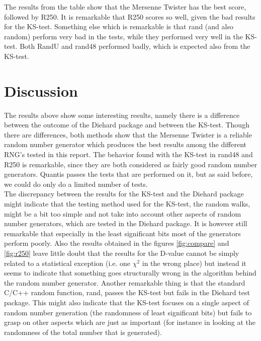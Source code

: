 \documentclass[10pt,a4paper]{article}
\begin{document}
\noindent The results from the table show that the Mersenne Twister has the best score, followed by R250. It is remarkable that R250 scores so well, given the bad results for the KS-test. Something else which is remarkable is that rand (and also random) perform very bad in the tests, while they performed very well in the KS-test. Both RandU and rand48 performed badly, which is expected also from the KS-test.

\section{Discussion}

\noindent The results above show some interesting results, namely there is a difference between the outcome of the Diehard package and between the KS-test. Though there are differences, both methods show that the Mersenne Twister is a reliable random number generator which produces the best results among the different RNG's tested in this report. The behavior found with the KS-test in rand48 and R250 is remarkable, since they are both considered as fairly good random number generators. Quantis passes the tests that are performed on it, but as said before, we could do only do a limited number of tests.\\
\newline
\noindent The discrepancy between the results for the KS-test and the Diehard package might indicate that the testing method used for the KS-test, the random walks, might be a bit too simple and not take into account other aspects of random number generators, which are tested in the Diehard package. It is however still remarkable that especially in the least significant bits most of the generators perform poorly. Also the results obtained in the figures \ref{fig:compare} and \ref{fig:r250} leave little doubt that the results for the D-value cannot be simply related to a statistical exception (i.e. one $\chi^2$ in the wrong place) but instead  it seems to indicate that something goes structurally wrong in the algorithm behind the random number generator. Another remarkable thing is that the standard C/C++ random function, rand, passes the KS-test but fails in the Diehard test package. This might also indicate that the KS-test focuses on a single aspect of random number generation (the randomness of least significant bits) but fails to grasp on other aspects which are just as important (for instance in looking at the randomness of the total number that is generated).\\
\end{document}
